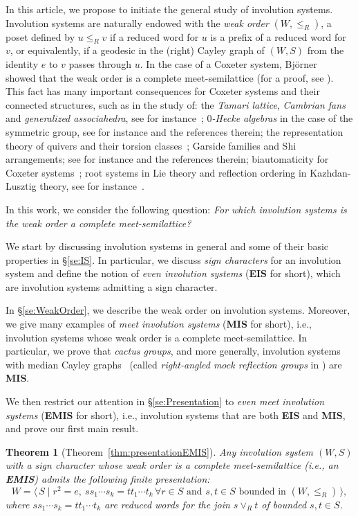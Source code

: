 \documentclass[A4paper, oneside]{amsart}
\newcommand{\id}{\textit{e}}
\newcommand{\mpair}[1]{\langle\, #1\,\rangle}  %
\newcommand{\EIS}{\textnormal{\bf EIS}\xspace}
\newcommand{\EMIS}{\textnormal{\bf EMIS}\xspace}
\newcommand{\MIS}{\textnormal{\bf MIS}\xspace}
\newtheorem{thm}{Theorem}[section]
\theoremstyle{definition}
\begin{document}
 In this article, we propose to initiate the general study of involution systems. Involution systems are naturally endowed with the {\em weak order} $(W,\leq_R)$, a poset defined by $u\leq_R v$ if a reduced word for $u$ is a prefix of a reduced word for $v$, or equivalently, if a geodesic in the (right) Cayley graph of $(W,S)$ from the identity $\id$ to $v$ passes through $u$. In the case of a Coxeter system, Bj\"orner~\cite{Bj84} showed that the weak order is a complete meet-semilattice (for a proof, see \cite[Theorem~3.2.1]{BjBr05}). This fact has many important consequences for Coxeter systems and their connected structures, such as in the study of:
 the {\em Tamari lattice}, {\em Cambrian fans} and {\em generalized associahedra}, see for instance~\cite{Asso12};
  {\em $0$-Hecke algebras} in the case of the symmetric group, see for instance \cite{TvW15} and the references therein; 
  the representation theory of quivers and their torsion classes~\cite{TorCl23}; 
  Garside families and Shi arrangements; see for instance \cite{DDH14,DFHM24} and the references therein; biautomaticity for Coxeter systems~\cite{OP22,Sa25}; root systems in Lie theory and reflection ordering in Kazhdan-Lusztig theory, see for instance~\cite{CePa04,Dy19}.
  
  \smallskip
   In this work, we  consider the following question: {\em For which involution systems is the weak order a complete meet-semilattice?} 
 
 \smallskip
 We start by discussing involution systems in general and some of their basic properties in  \S\ref{se:IS}. In particular, we discuss \emph{sign characters} for an involution system and define the notion of \emph{even involution systems} (\EIS for short), which are involution systems admitting a sign character. 

In \S\ref{se:WeakOrder}, we describe the weak order on involution systems. Moreover,  we give many examples of \emph{meet involution systems} (\MIS for short), i.e., involution systems whose weak order is a complete meet-semilattice. In particular, we prove that {\em cactus groups}, and more generally, involution systems with median Cayley graphs~\cite{genevois2022cactus} (called \emph{right-angled mock reflection groups} in \cite{RAMRG}) are \MIS. 

We then restrict our attention in \S\ref{se:Presentation} to \emph{even meet involution systems} (\EMIS for short), i.e., involution systems that are both \EIS and \MIS, and prove our first main result. 

\begin{thm}[Theorem~\ref{thm:presentationEMIS}] 
\label{thm:1}
Any involution system $(W,S)$ with a sign character whose weak order is a complete meet-semilattice (i.e., an \EMIS) admits the following finite presentation:
$$
W=\mpair{S\mid r^2=\id, \ ss_1\cdots s_k=tt_1\cdots t_k \, \forall r \in S \text{ and } s,t\in S\text{ bounded in } (W,\leq_R)},
$$  
where $ss_1\cdots s_k=tt_1\cdots t_k$ are reduced words for the join $s\vee_R t$ of bounded $s,t\in S$.
\end{thm}
\end{document}
